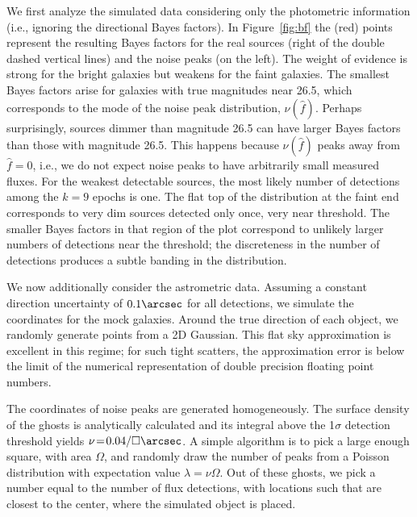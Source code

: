 \documentclass[twocolumn]{emulateapj}
\newcommand{\flux}{f}
\newcommand{\fest}{\hat{\flux}}  %
\newcommand{\npd}{\nu}  %
\begin{document}
We first analyze the simulated data considering only the photometric information (i.e., ignoring the directional Bayes factors).
In Figure~\ref{fig:bf} the (red) points represent the resulting Bayes factors for the real sources (right of the double dashed vertical lines) and the noise peaks (on the left).
%
The weight of evidence is strong for the bright galaxies but weakens for the faint galaxies.
The smallest Bayes factors arise for galaxies with true magnitudes near 26.5, which corresponds to the mode of the noise peak distribution, $\npd(\fest)$.
Perhaps surprisingly, sources dimmer than magnitude 26.5 can have larger Bayes factors than those with magnitude 26.5.
This happens because $\npd(\fest)$ peaks away from $\fest=0$, i.e., we do not expect noise peaks to have arbitrarily small measured fluxes.
For the weakest detectable sources, the most likely number of detections among the $k=9$ epochs is one.
The flat top of the distribution at the faint end corresponds to very dim sources detected only once, very near threshold.
The smaller Bayes factors in that region of the plot correspond to unlikely larger numbers of detections near the threshold; the discreteness in the number of detections produces a subtle banding in the distribution.



We now additionally consider the astrometric data.
Assuming a constant direction  uncertainty of $0.1\arcsec$ for all detections, we simulate the coordinates for the mock galaxies.
Around the true direction of each object, we randomly generate points from a 2D Gaussian.
This flat sky approximation is excellent in this regime; for such tight scatters, the approximation error is below the limit of the numerical representation of double precision floating point numbers.

The coordinates of noise peaks are generated homogeneously.
%
The surface density of the ghosts is analytically calculated and its integral above the 1$\sigma$ detection threshold yields \mbox{$\nu\!=\!0.04/\square\arcsec$}.
%
A simple algorithm is to pick a large enough square, with area $\Omega$, and randomly draw the number of peaks from a Poisson distribution with expectation value $\lambda=\nu\Omega$.
Out of these ghosts, we pick a number equal to the number of flux detections, with locations such that are closest to the center, where the simulated object is placed.
\end{document}
